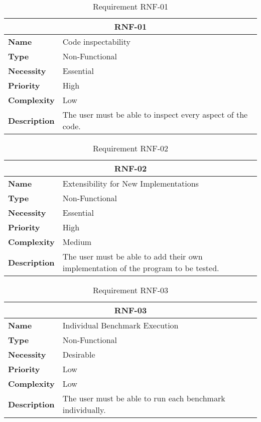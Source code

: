 \begin{table}[H]
    \centering
    \begin{tabular}{l p{10cm}}
        \toprule
        \multicolumn{2}{c}{\textbf{RNF-01}} \\
        \toprule
        \textbf{Name}               & Code inspectability \\
        \textbf{Type}               & Non-Functional \\
        \textbf{Necessity}          & Essential \\
        \textbf{Priority}           & High \\
        \textbf{Complexity}         & Low \\
        \textbf{Description}        & The user must be able to inspect every aspect of the code. \\
        \bottomrule
    \end{tabular}
\caption{Requirement RNF-01}\label{tab:rnf-01}
\end{table}

\begin{table}[H]
    \centering
    \begin{tabular}{l p{10cm}}
        \toprule
        \multicolumn{2}{c}{\textbf{RNF-02}} \\
        \toprule
        \textbf{Name}               & Extensibility for New Implementations \\
        \textbf{Type}               & Non-Functional \\
        \textbf{Necessity}          & Essential \\
        \textbf{Priority}           & High \\
        \textbf{Complexity}         & Medium \\
        \textbf{Description}        & The user must be able to add their own implementation of the program to be tested. \\
        \bottomrule
    \end{tabular}
\caption{Requirement RNF-02}\label{tab:rnf-02}
\end{table}

\begin{table}[H]
    \centering
    \begin{tabular}{l p{10cm}}
        \toprule
        \multicolumn{2}{c}{\textbf{RNF-03}} \\
        \toprule
        \textbf{Name}               & Individual Benchmark Execution \\
        \textbf{Type}               & Non-Functional \\
        \textbf{Necessity}          & Desirable \\
        \textbf{Priority}           & Low \\
        \textbf{Complexity}         & Low \\
        \textbf{Description}        & The user must be able to run each benchmark individually. \\
        \bottomrule
    \end{tabular}
\caption{Requirement RNF-03}\label{tab:rnf-03}
\end{table}


